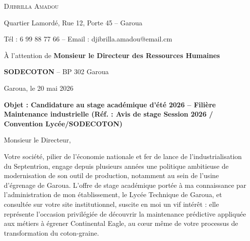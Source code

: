 \documentclass[11pt]{article}
\begin{document}
\begin{exoresolu}
\begin{center}
\begin{minipage}{\linewidth}
\setlength{\parindent}{0pt}
\setlength{\parskip}{4pt}
\textsc{Djibrilla Amadou}\par
Quartier Lamordé, Rue 12, Porte 45 -- Garoua\par
Tél : 6 99 88 77 66 -- Email : djibrilla.amadou@email.cm\par
\vspace{0.5cm}
\hfill
\begin{minipage}{0.6\linewidth}
\raggedleft
À l'attention de \textbf{Monsieur le Directeur des Ressources Humaines}\par
\textbf{SODECOTON} -- BP 302 Garoua\par
\vspace{0.3cm}
Garoua, le 20 mai 2026
\end{minipage}
\vspace{0.5cm}
\textbf{Objet : Candidature au stage académique d'été 2026 -- Filière Maintenance industrielle (Réf. : Avis de stage Session 2026 / Convention Lycée/SODECOTON)}\par
\vspace{0.5cm}
Monsieur le Directeur,\par
\vspace{0.2cm}
Votre société, pilier de l'économie nationale et fer de lance de l'industrialisation du Septentrion, engage depuis plusieurs années une politique ambitieuse de modernisation de son outil de production, notamment au sein de l'usine d'égrenage de Garoua. L'offre de stage académique portée à ma connaissance par l'administration de mon établissement, le Lycée Technique de Garoua, et consultée sur votre site institutionnel, suscite en moi un vif intérêt : elle représente l'occasion privilégiée de découvrir la maintenance prédictive appliquée aux métiers à égrener Continental Eagle, au cœur même de votre processus de transformation du coton-graine.\par
\vspace{0.2cm}

\end{minipage}
\end{center}
\end{exoresolu}
\end{document}
